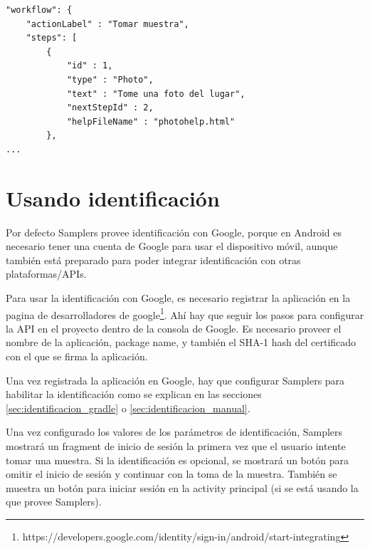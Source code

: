 \begin{lstlisting}[language=XML, frame=tlbr, caption=Ejemplo de configuración de ayuda en un Step (línea 9).]	
"workflow": {
	"actionLabel" : "Tomar muestra",
	"steps": [
		{
			"id" : 1,
			"type" : "Photo",
			"text" : "Tome una foto del lugar",
			"nextStepId" : 2,
			"helpFileName" : "photohelp.html"
		},      
...		
\end{lstlisting}


\section{Usando identificación} \label{sec:usando_autenticacion}
Por defecto Samplers provee identificación con Google, porque en Android es necesario tener una cuenta de Google para usar el dispositivo móvil, aunque también está preparado para poder integrar identificación con otras plataformas/APIs.

Para usar la identificación con Google, es necesario registrar la aplicación en la pagina de desarrolladores de google\footnote{https://developers.google.com/identity/sign-in/android/start-integrating}. Ahí hay que seguir los pasos para configurar la API en el proyecto dentro de la consola de Google. Es necesario proveer el nombre de la aplicación, package name, y también el SHA-1 hash del certificado con el que se firma la aplicación.

Una vez registrada la aplicación en Google, hay que configurar Samplers para habilitar la identificación como se explican en las secciones \ref{sec:identificacion_gradle} o \ref{sec:identificacion_manual}.

Una vez configurado los valores de los parámetros de identificación, Samplers mostrará un fragment de inicio de sesión la primera vez que el usuario intente tomar una muestra. Si la identificación es opcional, se mostrará un botón para omitir el inicio de sesión y continuar con la toma de la muestra. También se muestra un botón para iniciar sesión en la activity principal (si se está usando la que provee Samplers).

